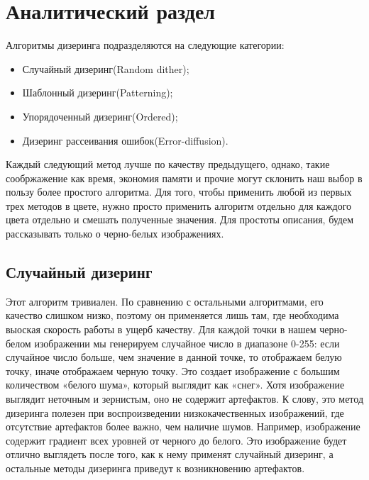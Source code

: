 \chapter{Аналитический раздел}
\label{cha:analysis}
%
%
Алгоритмы дизеринга подразделяются на следующие категории:

\begin{itemize}
\item  Случайный  дизеринг(Random dither);
\item Шаблонный дизеринг(Patterning);
\item Упорядоченный дизеринг(Ordered);
\item Дизеринг рассеивания ошибок(Error-diffusion).
\end{itemize}

Каждый следующий метод лучше по качеству предыдущего, однако, такие сообржажение как время, экономия памяти и прочие могут склонить наш выбор в пользу более простого алгоритма.
Для того, чтобы применить любой из первых трех методов в цвете, нужно просто применить алгоритм отдельно для каждого цвета отдельно и смешать полученные значения.
Для простоты описания, будем рассказывать только о черно-белых изображениях.




\section{Случайный дизеринг}
Этот алгоритм тривиален.  По сравнению с остальными алгоритмами, его качество слишком низко, поэтому он применяется лишь там, где необходима  выоская скорость работы в ущерб качеству. 
Для каждой точки в нашем черно-белом изображении мы генерируем случайное число в диапазоне 0-255: если случайное число больше, чем значение в данной точке, то отображаем белую точку, иначе отображаем черную точку.
Это создает изображение с большим количеством «белого шума»,  который выглядит как «снег». Хотя изображение выглядит неточным и зернистым, оно не содержит артефактов. К слову, это метод дизеринга полезен при воспроизведении низкокачественных изображений, где отсутствие артефактов более важно, чем наличие шумов. Например, изображение содержит градиент всех уровней от черного до белого. Это изображение будет отлично выглядеть после того, как к нему применят случайный дизеринг, а остальные методы дизеринга приведут к возникновению артефактов. 


